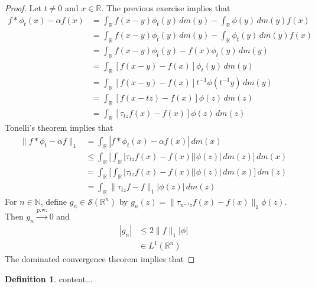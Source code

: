 \documentclass{book}
\theoremstyle{definition}
\newtheorem{defn}[definition]{Definition}
\newcommand{\al}{\alpha}
\newcommand{\N}{\mathbb{N}}
\newcommand{\R}{\mathbb{R}}
\newcommand{\MS}{\mathcal{S}}
\DeclareMathOperator*{\0}{\mbf{0}}
\DeclareMathOperator*{\1}{\mbf{1}}
\newcommand{\convt}[1]{\xrightarrow{\text{#1}}}
\newcommand{\dm}{\, d m}
\begin{document}
	\begin{proof}
		Let $t \neq 0$ and $x \in \R$. The previous exercise implies that 
		\begin{align*}
			f * \phi_t(x) - \al f(x) 
			& = \int_{\R} f(x-y) \phi_t(y) \dm(y) - \int_{\R} \phi(y) \dm(y) f(x) \\
			& = \int_{\R} f(x-y) \phi_t(y) \dm(y) - \int_{\R} \phi_t(y) \dm(y) f(x) \\
			& = \int_{\R} f(x-y) \phi_t(y)  -  f(x) \phi_t(y) \dm(y) \\
			& = \int_{\R} [f(x-y)  -  f(x)] \phi_t(y) \dm(y) \\
			& = \int_{\R} [f(x-y)  -  f(x)] t^{-1}\phi(t^{-1}y) \dm(y) \\
			& = \int_{\R} [f(x-tz)  -  f(x)] \phi(z) \dm(z) \\
			& = \int_{\R} [\tau_{tz}f(x) -  f(x)] \phi(z) \dm(z)   
		\end{align*}
		Tonelli's theorem implies that 
		\begin{align*}
			\|f * \phi_t - \al f \|_1
			& = \int_{\R}|f * \phi_t(x) - \al f(x) | \dm(x) \\
			& \leq \int_{\R} \bigg[ \int_{\R} |\tau_{tz}f(x)  -  f(x)| |\phi(z)| \dm(z) \bigg] \dm(x) \\
			& =  \int_{\R} \bigg[ \int_{\R} |\tau_{tz}f(x)  -  f(x)| |\phi(z)| \dm(x) \bigg] \dm(z) \\
			& = \int_{\R} \|\tau_{tz}f - f\|_1|\phi(z)| \dm(z)
		\end{align*}
		For $n \in \N$, define $g_n \in \MS(\R^n)$ by $g_n(z) = \|\tau_{n^{-1}z}f(x)  -  f(x)\|_1 \phi(z)$. Then $g_n \convt{p.w.} 0$ and 
		\begin{align*}
			|g_n| 
			& \leq 2\|f\|_1|\phi| \\
			& \in L^1(\R^n)
		\end{align*} 
		The dominated convergence theorem implies that 
		
	\end{proof}

	
	


	\begin{defn}
		content...
	\end{defn}
	
	
	
	
	
	
	
	
	
	
	
	
	
	
	
\end{document}
